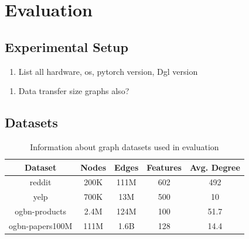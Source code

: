 \chapter{Evaluation} \label{Evaluation}

\section{Experimental Setup}
\begin{enumerate}
    \item List all hardware, os, pytorch version, Dgl version
\end{enumerate}

\begin{enumerate}
    \item Data transfer size graphs also?
\end{enumerate}

\section{Datasets}

\begin{table}[h!]
    \begin{center}
        \begin{tabular}{|c c c c c|} 
        \hline
        \textbf{Dataset} & \textbf{Nodes} & \textbf{Edges} & \textbf{Features} & \textbf{Avg. Degree} \\ [0.5ex] 
        \hline\hline
        reddit & 200K & 111M & 602 & 492 \\
        \hline
        yelp & 700K & 13M & 500 & 10 \\
        \hline
        ogbn-products & 2.4M & 124M & 100 & 51.7 \\
        \hline
        ogbn-papers100M & 111M & 1.6B & 128 & 14.4 \\
        \hline
        \end{tabular}
    \end{center}
    \caption{
        Information about graph datasets used in evaluation
    }
    \label{Eval: Dataset info}
\end{table}


